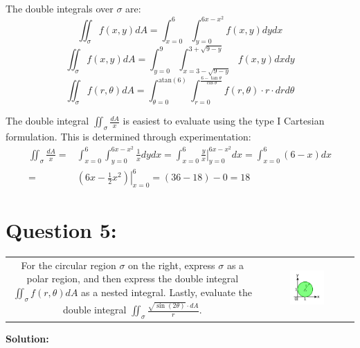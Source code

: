 \documentclass{article}
\newcommand{\atan}{\text{atan}}
\newcommand{\at}[1]{\left. #1 \right|}
\newcommand{\dr}[1]{\textcolor{dark_red}{#1}}
\begin{document}
\dr{
The double integrals over \(\sigma\) are:
\[\iint_{\sigma} f(x,y)dA = \int_{x = 0}^6 \int_{y = 0}^{6x - x^2} f(x,y)dydx\]
\[\iint_{\sigma} f(x,y)dA = \int_{y = 0}^9 \int_{x = 3 - \sqrt{9 - y}}^{3 + \sqrt{9 - y}} f(x,y)dxdy\]
\[\iint_{\sigma} f(r,\theta)dA = \int_{\theta = 0}^{\atan(6)} \int_{r = 0}^{\frac{6 - \tan\theta}{\cos\theta}} f(r,\theta) \cdot r \cdot drd\theta\]
}

\dr{
The double integral \(\iint_{\sigma} \frac{dA}{x}\) is easiest to evaluate using the type I Cartesian formulation. This is determined through experimentation:
\begin{align*}
\iint_{\sigma} \frac{dA}{x} = & \int_{x = 0}^6 \int_{y = 0}^{6x - x^2} \frac{1}{x}dydx 
= \int_{x = 0}^6 \at{\frac{y}{x}}_{y = 0}^{6x - x^2}dx 
= \int_{x = 0}^6 (6 - x)dx \\
= & \at{(6x - \frac{1}{2}x^2)}_{x = 0}^6 
= (36 - 18) - 0 = 18
\end{align*}
}




\section*{Question 5:}

\begin{tabular}{cc}
\parbox{0.6\textwidth}{For the circular region \(\sigma\) on the right, express \(\sigma\) as a polar region, and then express the double integral \(\iint_{\sigma} f(r,\theta)dA\) as a nested integral. Lastly, evaluate the double integral \(\iint_{\sigma} \frac{\sqrt{\sin(2\theta)} \cdot dA}{r}\).} 
&
\parbox{0.4\textwidth}{\includegraphics[width = 0.4\textwidth]{Test_bench_part_3_images/Test_bench_part_3_image_2}}
\end{tabular}

\vspace{5mm}
\dr{\textbf{Solution:}}
\end{document}
